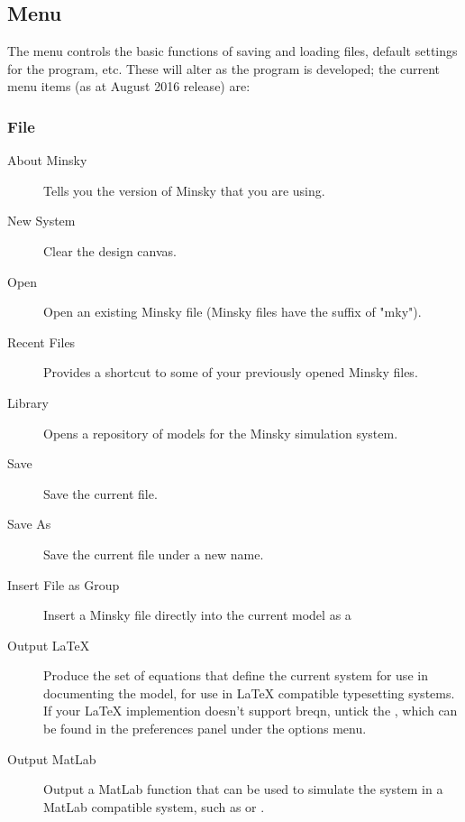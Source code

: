 \subsection{Menu}
\label{Menu}



The menu controls the basic functions of saving and loading files,
default settings for the program, etc. These will alter as the program
is developed; the current menu items (as at August 2016 release) are:

\subsubsection{File}
\label{File}

\begin{description}
\item[About Minsky] Tells you the version of Minsky that you are using.

\item[New System] Clear the design canvas.

\item[Open] Open an existing Minsky file (Minsky files have the suffix of "mky").

\item[Recent Files]\label{recentfiles} Provides a shortcut to some of
your previously opened Minsky files.

\item[Library] Opens a repository of models for the Minsky simulation system.

\item[Save] Save the current file.

\item[Save As] Save the current file under a new name.

\item[Insert File as Group] Insert a Minsky file directly into the
current model as a 

\item[Output LaTeX] Produce the set of equations that define the
  current system for use in documenting the model, for use in LaTeX
  compatible typesetting systems. If your LaTeX implemention doesn't
  support breqn, untick the , which can be found in the preferences panel under the options menu. 
 
\item[Output MatLab] Output a MatLab function that can be used to
simulate the system in a MatLab compatible system, such as
or .


\end{description}
